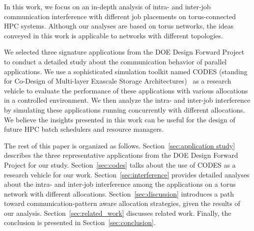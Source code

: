In this work, we focus on an in-depth analysis of intra- and inter-job 
communication interference with different job placements on torus-connected HPC systems. 
Although our analyses are based on torus networks, 
the ideas conveyed in this work is applicable to networks with different topologies. 

We selected three signature applications from 
the DOE Design Forward Project~\cite{designforwardwebpage}  
to conduct a detailed study about the communication behavior of parallel applications. 
We use a sophisticated simulation toolkit named CODES 
(standing for Co-Design of Multi-layer Exascale Storage Architectures)~\cite{Jason-2011} 
as a research vehicle to evaluate the performance of these applications 
with various allocations in a controlled environment. 
We then analyze the intra- and inter-job interference 
by simulating these applications running concurrently with different allocations. 
We believe the insights presented in this work can be useful 
for the design of future HPC batch schedulers and resource managers.


The rest of this paper is organized as follows. 
Section~\ref{sec:application study} describes the three representative applications 
from the DOE Design Forward Project for our study. 
Section~\ref{sec:codes} talks about the use of CODES as a research vehicle for our work. 
Section~\ref{sec:interference} provides detailed analyses about the intra- and inter-job interference 
among the applications on a torus network with different allocations. 
Section~\ref{sec:discussion} introduces a path toward communication-pattern aware allocation strategies, 
given the results of our analysis. 
Section~\ref{sec:related_work} discusses related work. 
Finally, the conclusion is presented in Section~\ref{sec:conclusion}.




